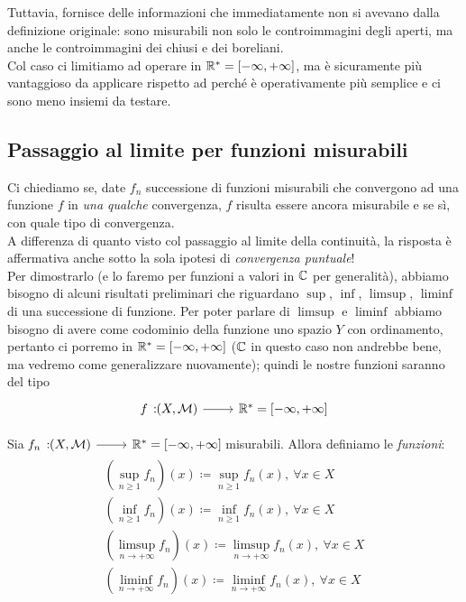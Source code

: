 Tuttavia,  fornisce delle informazioni che immediatamente non si avevano dalla definizione originale: sono misurabili non solo le controimmagini degli aperti, ma anche le controimmagini dei chiusi e dei boreliani.\\
Col caso  ci limitiamo ad operare in $\mathbb{R}^{\ast}=\left[-\infty,+\infty\right]$, ma è sicuramente più vantaggioso da applicare rispetto ad  perché è operativamente più semplice e ci sono meno insiemi da testare.
\subsection{Passaggio al limite per funzioni misurabili}
Ci chiediamo se, date $f_n$ successione di funzioni misurabili che convergono ad una funzione $f$ in \textit{una qualche} convergenza, $f$ risulta essere ancora misurabile e se sì, con quale tipo di convergenza.\\
A differenza di quanto visto col passaggio al limite della continuità, la risposta è affermativa anche sotto la sola ipotesi di \textit{convergenza puntuale}!\\
Per dimostrarlo (e lo faremo per funzioni a valori in $\mathbb{C}$ per generalità), abbiamo bisogno di alcuni risultati preliminari che riguardano $\sup$, $\inf$, $\limsup$, $\liminf$ di una successione di funzione. Per poter parlare di $\limsup$ e $\liminf$ abbiamo bisogno di avere come codominio della funzione uno spazio $Y$ con ordinamento, pertanto ci porremo in  $\mathbb{R}^{\ast}=\left[-\infty,+\infty\right]$ ($\mathbb{C}$ in questo caso non andrebbe bene, ma vedremo come generalizzare nuovamente); quindi le nostre funzioni saranno del tipo
\begin{equation*}
\funz{f}{\left(X,\mathcal{M}\right)}{\realset^{\ast}=\left[-\infty,+\infty\right]}
\end{equation*}
\begin{define}	
Sia $\funz{f_n}{\left(X,\mathcal{M}\right)}{\realset^{\ast}=\left[-\infty,+\infty\right]}$ misurabili.
Allora definiamo le \textit{funzioni}:
\begin{gather*}
	\left(\sup_{n\geq 1} f_n\right)(x)\coloneqq \sup_{n\geq 1}f_n(x),\ \forall x\in X\\
	\left(\inf_{n\geq 1} f_n\right)(x)\coloneqq \inf_{n\geq 1}f_n(x),\ \forall x\in X\\
	\left(\limsup_{n\to+\infty} f_n\right)(x)\coloneqq \limsup_{n\to+\infty}f_n(x),\ \forall x\in X\\
	\left(\liminf_{n\to+\infty} f_n\right)(x)\coloneqq \liminf_{n\to+\infty}f_n(x),\ \forall x\in X
\end{gather*}
\end{define}
